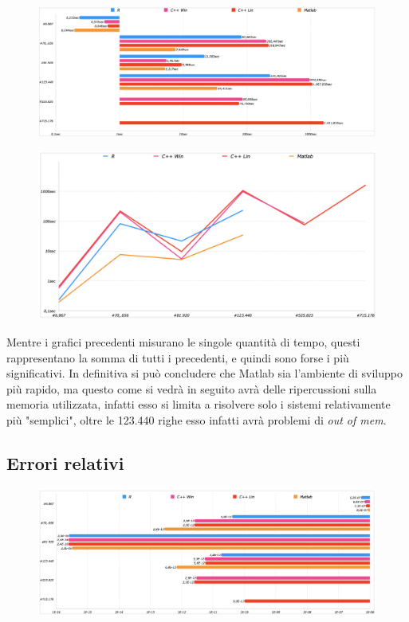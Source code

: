 \documentclass[preprint,12pt]{elsarticle}
\begin{document}
\begin{figure}[H]
	\centering
	\includegraphics[width=\linewidth]{total1}
\end{figure}

\begin{figure}[H]
	\centering
	\includegraphics[width=\linewidth]{total2}
\end{figure}

Mentre i grafici precedenti misurano le singole quantità di tempo, questi rappresentano la somma di tutti i precedenti, e quindi sono forse i più significativi.
In definitiva si può concludere che Matlab sia l'ambiente di sviluppo più rapido, ma questo come si vedrà in seguito avrà delle ripercussioni sulla memoria utilizzata, infatti esso si limita a risolvere solo i sistemi relativamente più "semplici", oltre le 123.440 righe esso infatti avrà problemi di \textit{out of mem}.

\subsection{Errori relativi}

\begin{figure}[H]
	\centering
	\includegraphics[width=\linewidth]{errore1}
\end{figure}
\end{document}
